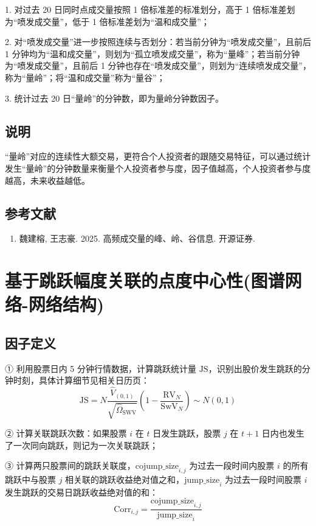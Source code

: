 \documentclass{article}
\begin{document}
1. 对过去 20 日同时点成交量按照 1 倍标准差的标准划分，高于 1 倍标准差划为“喷发成交量”，低于 1 倍标准差划为“温和成交量”；

2. 对“喷发成交量”进一步按照连续与否划分：若当前分钟为“喷发成交量”，且前后 1 分钟均为“温和成交量”，则划为“孤立喷发成交量”，称为“量峰”；若当前分钟为“喷发成交量”，且前后 1 分钟也存在“喷发成交量”，则划为“连续喷发成交量”，称为“量岭”；将“温和成交量”称为“量谷”；

3. 统计过去 20 日“量岭”的分钟数，即为量岭分钟数因子。

\subsection{说明}
“量岭”对应的连续性大额交易，更符合个人投资者的跟随交易特征，可以通过统计发生“量岭”的分钟数量来衡量个人投资者参与度，因子值越高，个人投资者参与度越高，未来收益越低。

\subsection{参考文献}
\begin{enumerate}
    \item 魏建榕, 王志豪. 2025. 高频成交量的峰、岭、谷信息. 开源证券.
\end{enumerate}

\section{基于跳跃幅度关联的点度中心性(图谱网络-网络结构)}

\subsection{因子定义}


① 利用股票日内 5 分钟行情数据，计算跳跃统计量 \( \mathrm{JS} \)，识别出股价发生跳跃的分钟时刻，具体计算细节见相关日历页：
\begin{equation}
    \mathrm{JS} = N \frac{\hat{V}_{(0,1)}}{\sqrt{\hat{\Omega}_{\mathrm{SWV}}}} \left( 1 - \frac{\mathrm{RV}_N}{\mathrm{SwV}_N} \right) \sim N(0,1)
\end{equation}

② 计算关联跳跃次数：如果股票 \( i \) 在 \( t \) 日发生跳跃，股票 \( j \) 在 \( t+1 \) 日内也发生了一次同向跳跃，则记为一次关联跳跃；

③ 计算两只股票间的跳跃关联度，\( \mathrm{cojump\_size}_{i,j} \) 为过去一段时间内股票 \( i \) 的所有跳跃中与股票 \( j \) 相关联的跳跃收益绝对值之和，\( \mathrm{jump\_size}_i \) 为过去一段时间股票 \( i \) 发生跳跃的交易日跳跃收益绝对值的和：
\begin{equation}
    \mathrm{Corr}_{i,j} = \frac{\mathrm{cojump\_size}_{i,j}}{\mathrm{jump\_size}_i}
\end{equation}
\end{document}
